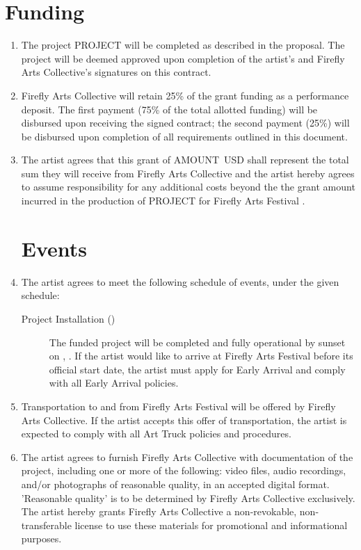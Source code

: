 \documentclass[11pt]{article}
\newcommand{\fac}{Firefly Arts Collective}
\newcommand{\project}{PROJECT}
\newcommand{\amount}{AMOUNT}
\begin{document}
\section*{Funding}
\begin{enumerate}
\item The project \project{} will be completed as described in the proposal.  The project will be deemed approved upon
  completion of the artist's and \fac{}'s signatures on this contract.

\item \fac{} will retain 25\% of the grant funding as a performance deposit.  The first payment (75\% of the total allotted
  funding) will be disbursed upon receiving the signed contract; the second payment (25\%) will be disbursed upon completion of
  all requirements outlined in this document.

\item The artist agrees that this grant of \amount{}\ USD shall represent the total sum they will receive from \fac{} and the artist hereby
  agrees to assume responsibility for any additional costs beyond the the grant amount incurred in the production of
  \project{} for Firefly Arts Festival \the\year{}.

\section*{Events}
\item The artist agrees to meet the following schedule of events, under the given schedule:

  \begin{description}
    \item[Project Installation (\instdate{})] The funded project will be completed and fully operational by sunset on
      \instday{}, \instdate{}.  If the artist would like to arrive at Firefly Arts Festival before its official start
      date, the artist must apply for Early Arrival and comply with all Early Arrival policies.
  \end{description}

\item Transportation to and from Firefly Arts Festival will be offered by \fac{}.  If the artist accepts this offer of
  transportation, the artist is expected to comply with all Art Truck policies and procedures.

\item The artist agrees to furnish \fac{} with documentation of the project, including one or more of the following: video
  files, audio recordings, and/or photographs of reasonable quality, in an accepted digital format.  'Reasonable quality' is to be determined by
 \fac{} exclusively.  The artist hereby grants \fac{} a non-revokable, non-transferable license to use these materials for promotional and informational
 purposes.


\end{enumerate}
\end{document}
